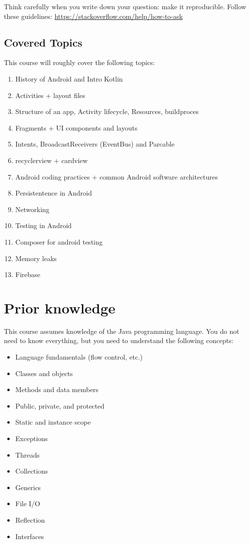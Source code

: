 Think carefully when you write down your question: make it reproducible. Follow these guidelines: \href{https://stackoverflow.com/help/how-to-ask}{https://stackoverflow.com/help/how-to-ask}

\subsection{Covered Topics}
This course will roughly cover the following topics:

\begin{enumerate}
	\item History of  Android and Intro Kotlin
	\item Activities + layout files 
	\item Structure of an  app, Activity lifecycle, Resources, buildproces
	\item Fragments + UI components and layouts 
	\item Intents, BroadcastReceivers (EventBus) and Parcable 
	\item recyclerview + cardview 
	\item Android coding practices  + common Android software architectures  
	\item Persistentence in Android
	\item Networking
	\item Testing in Android
	\item Composer for android testing
	\item Memory leaks 
	\item Firebase 
\end{enumerate}

\section{Prior knowledge}
This course assumes knowledge of the Java programming language.
You do not need to know everything, but you need to understand the following concepts:

\begin{itemize}
	\item Language fundamentals (flow control, etc.)
	\item Classes and objects
	\item Methods and data members
	\item Public, private, and protected
	\item Static and instance scope
	\item Exceptions
	\item Threads
	\item Collections
	\item Generics
	\item File I/O
	\item Reflection
	\item Interfaces
\end{itemize}

